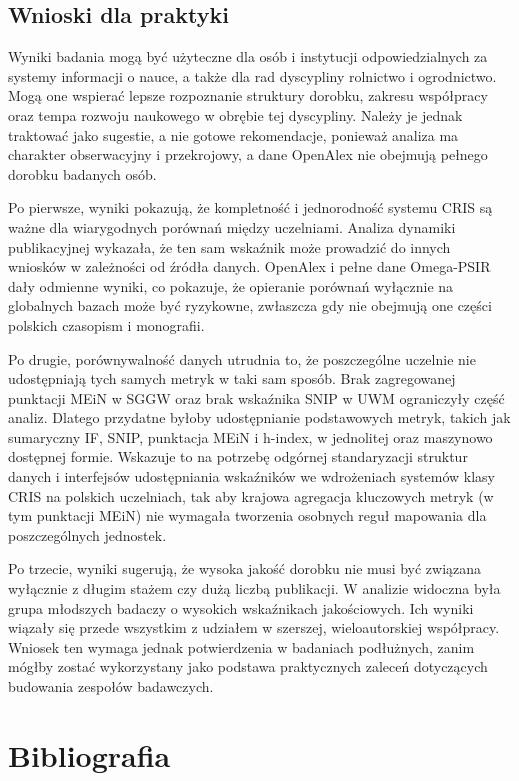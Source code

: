 \documentclass[
  polish,
  12pt,
  a4paper,
]{article}
\begin{document}
\subsection{Wnioski dla praktyki}\label{wnioski-dla-praktyki}

Wyniki badania mogą być użyteczne dla osób i instytucji odpowiedzialnych
za systemy informacji o nauce, a także dla rad dyscypliny rolnictwo i
ogrodnictwo. Mogą one wspierać lepsze rozpoznanie struktury dorobku,
zakresu współpracy oraz tempa rozwoju naukowego w obrębie tej
dyscypliny. Należy je jednak traktować jako sugestie, a nie gotowe
rekomendacje, ponieważ analiza ma charakter obserwacyjny i przekrojowy,
a dane OpenAlex nie obejmują pełnego dorobku badanych osób.

Po pierwsze, wyniki pokazują, że kompletność i jednorodność systemu CRIS
są ważne dla wiarygodnych porównań między uczelniami. Analiza dynamiki
publikacyjnej wykazała, że ten sam wskaźnik może prowadzić do innych
wniosków w zależności od źródła danych. OpenAlex i pełne dane Omega-PSIR
dały odmienne wyniki, co pokazuje, że opieranie porównań wyłącznie na
globalnych bazach może być ryzykowne, zwłaszcza gdy nie obejmują one
części polskich czasopism i monografii.

Po drugie, porównywalność danych utrudnia to, że poszczególne uczelnie
nie udostępniają tych samych metryk w taki sam sposób. Brak zagregowanej
punktacji MEiN w SGGW oraz brak wskaźnika SNIP w UWM ograniczyły część
analiz. Dlatego przydatne byłoby udostępnianie podstawowych metryk,
takich jak sumaryczny IF, SNIP, punktacja MEiN i h-index, w jednolitej
oraz maszynowo dostępnej formie. Wskazuje to na potrzebę odgórnej
standaryzacji struktur danych i interfejsów udostępniania wskaźników we
wdrożeniach systemów klasy CRIS na polskich uczelniach, tak aby krajowa
agregacja kluczowych metryk (w tym punktacji MEiN) nie wymagała
tworzenia osobnych reguł mapowania dla poszczególnych jednostek.

Po trzecie, wyniki sugerują, że wysoka jakość dorobku nie musi być
związana wyłącznie z długim stażem czy dużą liczbą publikacji. W
analizie widoczna była grupa młodszych badaczy o wysokich wskaźnikach
jakościowych. Ich wyniki wiązały się przede wszystkim z udziałem w
szerszej, wieloautorskiej współpracy. Wniosek ten wymaga jednak
potwierdzenia w badaniach podłużnych, zanim mógłby zostać wykorzystany
jako podstawa praktycznych zaleceń dotyczących budowania zespołów
badawczych.

\newpage{}

\section{Bibliografia}\label{bibliografia}
\end{document}
